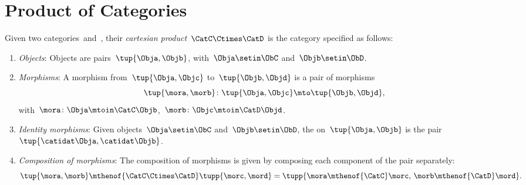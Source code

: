 
\section{Product of Categories}

\begin{ctdefinition}
    \label{def:cartesian-product-category}
    Given two categories~\CatC and~\CatD, their \emph{cartesian product}~$\CatC \Ctimes \CatD$ is the category specified as follows:
    \begin{enumerate}
        \item \emph{Objects}: Objects are pairs~$\tup{\Obja,\Objb}$, with~$\Obja\setin \ObC$ and~$\Objb\setin \ObD$.
        \item \emph{Morphisms}: A morphism from~$\tup{\Obja, \Objc}$ to~$\tup{\Objb,\Objd}$ is a pair of morphisms
              \begin{equation}
                  \tup{\mora,\morb} \colon \tup{\Obja,\Objc}\mto \tup{\Objb,\Objd},
              \end{equation}
              with~$\mora\colon \Obja \mtoin\CatC \Objb$,~$\morb\colon \Objc\mtoin\CatD \Objd$.
        \item \emph{Identity morphisms}: Given objects~$\Obja\setin \ObC$ and~$\Objb\setin \ObD$, the  on~$\tup{\Obja,\Objb}$ is the pair $\tup{\catidat\Obja,\catidat\Objb}$.
        \item \emph{Composition of morphisms}: The composition of morphisms is given by composing each component of the pair separately:
              \begin{equation}
                  \tup{\mora,\morb}\mthenof{\CatC\Ctimes\CatD} \tupp{\morc,\mord}=\tupp{\mora\mthenof{\CatC}\morc,\, \morb \mthenof{\CatD} \mord}.
              \end{equation}
    \end{enumerate}
\end{ctdefinition}



